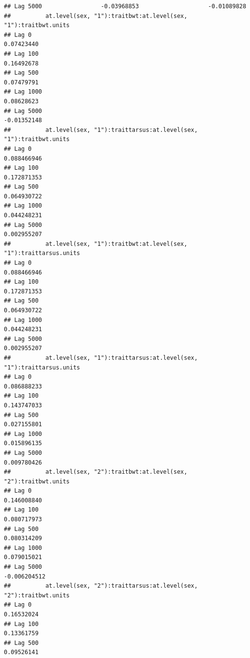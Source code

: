 \documentclass[
  12pt,
]{book}
\begin{document}
\begin{verbatim}
## Lag 5000                 -0.03968853                    -0.01089828
##          at.level(sex, "1"):traitbwt:at.level(sex, "1"):traitbwt.units
## Lag 0                                                       0.07423440
## Lag 100                                                     0.16492678
## Lag 500                                                     0.07479791
## Lag 1000                                                    0.08628623
## Lag 5000                                                   -0.01352148
##          at.level(sex, "1"):traittarsus:at.level(sex, "1"):traitbwt.units
## Lag 0                                                         0.088466946
## Lag 100                                                       0.172871353
## Lag 500                                                       0.064930722
## Lag 1000                                                      0.044248231
## Lag 5000                                                      0.002955207
##          at.level(sex, "1"):traitbwt:at.level(sex, "1"):traittarsus.units
## Lag 0                                                         0.088466946
## Lag 100                                                       0.172871353
## Lag 500                                                       0.064930722
## Lag 1000                                                      0.044248231
## Lag 5000                                                      0.002955207
##          at.level(sex, "1"):traittarsus:at.level(sex, "1"):traittarsus.units
## Lag 0                                                            0.086888233
## Lag 100                                                          0.143747033
## Lag 500                                                          0.027155801
## Lag 1000                                                         0.015896135
## Lag 5000                                                         0.009780426
##          at.level(sex, "2"):traitbwt:at.level(sex, "2"):traitbwt.units
## Lag 0                                                      0.146008840
## Lag 100                                                    0.080717973
## Lag 500                                                    0.080314209
## Lag 1000                                                   0.079015021
## Lag 5000                                                  -0.006204512
##          at.level(sex, "2"):traittarsus:at.level(sex, "2"):traitbwt.units
## Lag 0                                                          0.16532024
## Lag 100                                                        0.13361759
## Lag 500                                                        0.09526141

\end{verbatim}
\end{document}
